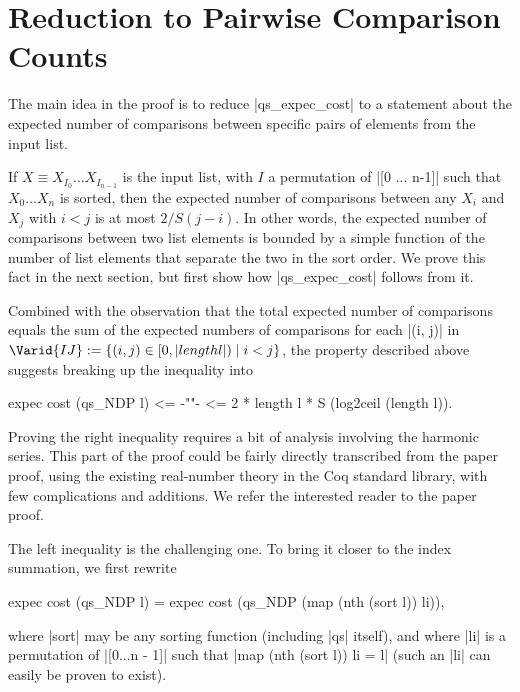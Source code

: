 \documentclass[runningheads]{llncs}
\begin{document}
\section{Reduction to Pairwise Comparison Counts}
\label{reduction}

The main idea in the proof is to reduce |qs_expec_cost| to a statement about the expected number of comparisons between specific pairs of elements from the input list.

If $X \equiv X_{I_0} \ldots X_{I_{n-1}}$ is the input list, with $I$ a permutation of |[0 ... n-1]| such that $X_0 \ldots X_n$ is sorted, then the expected number of comparisons between any $X_i$ and $X_j$ with $i < j$ is at most $2 / S (j - i)$. In other words, the expected number of comparisons between two list elements is bounded by a simple function of the number of list elements that separate the two in the sort order. We prove this fact in the next section, but first show how |qs_expec_cost| follows from it.

Combined with the observation that the total expected number of comparisons equals the sum of the expected numbers of comparisons for each |(i, j)| in $\Varid{IJ} := \{ (i, j) \in [0, |length l|) \mid i < j \}$, the property described above suggests breaking up the inequality into
\begin{code}
  expec cost (qs_NDP l) <= {-""-} <= 2 * length l * S (log2ceil (length l)).
\end{code}
Proving the right inequality requires a bit of analysis involving the harmonic series. This part of the proof could be fairly directly transcribed from the paper proof, using the existing real-number theory in the Coq standard library, with few complications and additions. We refer the interested reader to the paper proof.

The left inequality is the challenging one. To bring it closer to the index summation, we first rewrite
\begin{code}
  expec cost (qs_NDP l) = expec cost (qs_NDP (map (nth (sort l)) li)),
\end{code}
where |sort| may be any sorting function (including |qs| itself), and where |li| is a permutation of |[0...n - 1]| such that |map (nth (sort l)) li = l| (such an |li| can easily be proven to exist).
\end{document}
